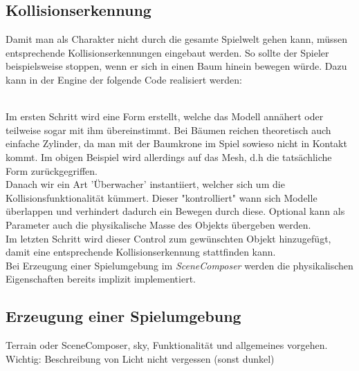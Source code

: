 \subsection{Kollisionserkennung}
Damit man als Charakter nicht durch die gesamte Spielwelt gehen kann, müssen entsprechende Kollisionserkennungen eingebaut werden. So sollte der Spieler beispielsweise stoppen, wenn er sich in einen Baum hinein bewegen würde. Dazu kann in der Engine der folgende Code realisiert werden:


\colorbox{grau}{\parbox{\dimexpr\textwidth-8\fboxsep}{\centering
		\begin{center}
		\end{center}
		\begin{center}
		\end{center}
		\begin{center}
		\end{center}
}}\bigskip \\Im ersten Schritt wird eine Form erstellt, welche das Modell annähert oder teilweise sogar mit ihm übereinstimmt. Bei Bäumen reichen theoretisch auch einfache Zylinder, da man mit der Baumkrone im Spiel sowieso nicht in Kontakt kommt. Im obigen Beispiel wird allerdings auf das Mesh, d.h  die tatsächliche Form zurückgegriffen.\\
Danach wir ein Art 'Überwacher' instantiiert, welcher sich um die Kollisionsfunktionalität kümmert. Dieser "kontrolliert" wann sich Modelle überlappen und verhindert dadurch ein Bewegen durch diese. Optional kann als Parameter auch die physikalische Masse des Objekts übergeben werden.\\
Im letzten Schritt wird dieser Control zum gewünschten Objekt hinzugefügt, damit eine entsprechende Kollisionserkennung stattfinden kann.\\
Bei Erzeugung einer Spielumgebung im \emph{SceneComposer} werden die physikalischen Eigenschaften bereits implizit implementiert.


\subsection{Erzeugung einer Spielumgebung}
Terrain oder SceneComposer, sky, 
Funktionalität und allgemeines vorgehen.
Wichtig: Beschreibung von Licht nicht vergessen (sonst dunkel)

